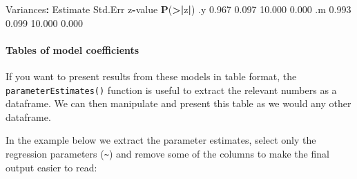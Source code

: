 \documentclass[]{article}
\newenvironment{Shaded}{\begin{snugshade}}{\end{snugshade}}
\newcommand{\DataTypeTok}[1]{\textcolor[rgb]{0.13,0.29,0.53}{#1}}
\newcommand{\ErrorTok}[1]{\textcolor[rgb]{0.64,0.00,0.00}{\textbf{#1}}}
\newcommand{\FloatTok}[1]{\textcolor[rgb]{0.00,0.00,0.81}{#1}}
\newcommand{\KeywordTok}[1]{\textcolor[rgb]{0.13,0.29,0.53}{\textbf{#1}}}
\newcommand{\NormalTok}[1]{#1}
\newcommand{\OperatorTok}[1]{\textcolor[rgb]{0.81,0.36,0.00}{\textbf{#1}}}
\newcommand{\StringTok}[1]{\textcolor[rgb]{0.31,0.60,0.02}{#1}}
\let\oldparagraph\paragraph
\renewcommand{\paragraph}[1]{\oldparagraph{#1}\mbox{}}
\begin{document}
\begin{Shaded}
\begin{Highlighting}[]
\NormalTok{Variances}\OperatorTok{:}
\StringTok{                   }\NormalTok{Estimate  Std.Err  z}\OperatorTok{-}\NormalTok{value  }\KeywordTok{P}\NormalTok{(}\OperatorTok{>}\ErrorTok{|}\NormalTok{z}\OperatorTok{|}\NormalTok{)}
\NormalTok{   .y                 }\FloatTok{0.967}    \FloatTok{0.097}   \FloatTok{10.000}    \FloatTok{0.000}
\NormalTok{   .m                 }\FloatTok{0.993}    \FloatTok{0.099}   \FloatTok{10.000}    \FloatTok{0.000}
\end{Highlighting}
\end{Shaded}

\hypertarget{tables-of-model-coefficients}{%
\paragraph{Tables of model coefficients}\label{tables-of-model-coefficients}}

If you want to present results from these models in table format, the
\texttt{parameterEstimates()} function is useful to extract the relevant numbers as a
dataframe. We can then manipulate and present this table as we would any other
dataframe.

In the example below we extract the parameter estimates, select only the
regression parameters (\texttt{\textasciitilde{}}) and remove some of the columns to make the final
output easier to read:

\begin{Shaded}
\end{Shaded}
\end{document}
